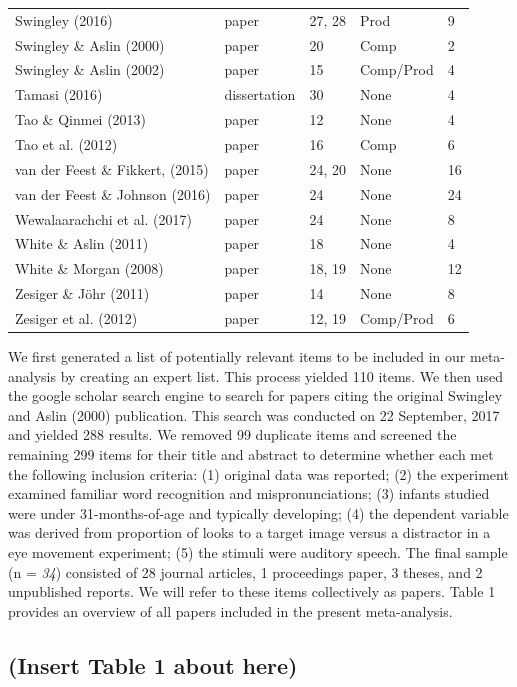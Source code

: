 \documentclass[man]{apa6}
\newenvironment{lltable}{\begin{landscape}\begin{center}\begin{ThreePartTable}}{\end{ThreePartTable}\end{center}\end{landscape}}
\theoremstyle{definition}
\theoremstyle{definition}
\theoremstyle{definition}
\theoremstyle{remark}
\begin{document}
\begin{lltable}
\begin{longtable}{lllll}
Swingley (2016) & paper & 27, 28 & Prod & 9\\
Swingley \& Aslin (2000) & paper & 20 & Comp & 2\\
Swingley \& Aslin (2002) & paper & 15 & Comp/Prod & 4\\
Tamasi (2016) & dissertation & 30 & None & 4\\
Tao \& Qinmei (2013) & paper & 12 & None & 4\\
Tao et al. (2012) & paper & 16 & Comp & 6\\
van der Feest \& Fikkert, (2015) & paper & 24, 20 & None & 16\\
van der Feest \& Johnson (2016) & paper & 24 & None & 24\\
Wewalaarachchi et al. (2017) & paper & 24 & None & 8\\
White \& Aslin (2011) & paper & 18 & None & 4\\
White \& Morgan (2008) & paper & 18, 19 & None & 12\\
Zesiger \& Jöhr (2011) & paper & 14 & None & 8\\
Zesiger et al. (2012) & paper & 12, 19 & Comp/Prod & 6\\
\bottomrule
\end{longtable}
\end{lltable}

We first generated a list of potentially relevant items to be included
in our meta-analysis by creating an expert list. This process yielded
110 items. We then used the google scholar search engine to search for
papers citing the original Swingley and Aslin (2000) publication. This
search was conducted on 22 September, 2017 and yielded 288 results. We
removed 99 duplicate items and screened the remaining 299 items for
their title and abstract to determine whether each met the following
inclusion criteria: (1) original data was reported; (2) the experiment
examined familiar word recognition and mispronunciations; (3) infants
studied were under 31-months-of-age and typically developing; (4) the
dependent variable was derived from proportion of looks to a target
image versus a distractor in a eye movement experiment; (5) the stimuli
were auditory speech. The final sample (n = \emph{34}) consisted of 28
journal articles, 1 proceedings paper, 3 theses, and 2 unpublished
reports. We will refer to these items collectively as papers. Table 1
provides an overview of all papers included in the present
meta-analysis.

\subsection{(Insert Table 1 about
here)}\label{insert-table-1-about-here}
\end{document}
